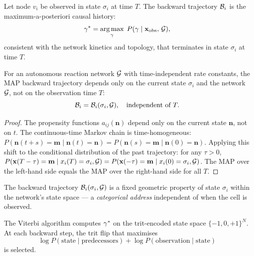 \begin{definition}
\label{def:map-traj}
Let node $v_i$ be observed in state $\sigma_i$ at time $T$.  The backward
trajectory $\mathcal{B}_i$ is the maximum-a-posteriori causal history:
\begin{equation}
  \gamma^{*}
  = \operatorname*{arg\,max}_{\gamma}
    \;P(\gamma \mid \mathbf{x}_{\mathrm{obs}},\, \mathcal{G}),
  \label{eq:ch08-map-traj}
\end{equation}
consistent with the network kinetics and topology, that terminates in
state $\sigma_i$ at time $T$.
\end{definition}

\begin{theorem}
\label{thm:timeinv}
For an autonomous reaction network $\mathcal{G}$ with time-independent rate
constants, the MAP backward trajectory depends only on the current state
$\sigma_i$ and the network $\mathcal{G}$, not on the observation time $T$:
\begin{equation}
  \mathcal{B}_i = \mathcal{B}_i(\sigma_i, \mathcal{G}),
  \quad \text{independent of } T.
\end{equation}
\end{theorem}

\begin{proof}
The propensity functions $a_{ij}(\mathbf{n})$ depend only on the current
state $\mathbf{n}$, not on $t$.  The continuous-time Markov chain is
time-homogeneous:
$P(\mathbf{n}(t+s) = \mathbf{m} \mid \mathbf{n}(t) = \mathbf{n})
= P(\mathbf{n}(s) = \mathbf{m} \mid \mathbf{n}(0) = \mathbf{n})$.
Applying this shift to the conditional distribution of the past trajectory:
for any $\tau > 0$,
$P(\mathbf{x}(T-\tau) = \mathbf{m} \mid x_i(T) = \sigma_i, \mathcal{G})
= P(\mathbf{x}(-\tau) = \mathbf{m} \mid x_i(0) = \sigma_i, \mathcal{G})$.
The MAP over the left-hand side equals the MAP over the right-hand side
for all $T$.
\end{proof}

\begin{corollary}
\label{cor:address}
The backward trajectory $\mathcal{B}_i(\sigma_i, \mathcal{G})$ is a fixed geometric
property of state $\sigma_i$ within the network's state space --- a
\emph{categorical address} independent of when the cell is observed.
\end{corollary}

The Viterbi algorithm computes $\gamma^{*}$ on the trit-encoded state space
$\{-1, 0, +1\}^N$.  At each backward step, the trit flip that maximises
\begin{equation}
  \log P(\text{state} \mid \text{predecessors})
  + \log P(\text{observation} \mid \text{state})
  \label{eq:viterbi-score}
\end{equation}
is selected.

